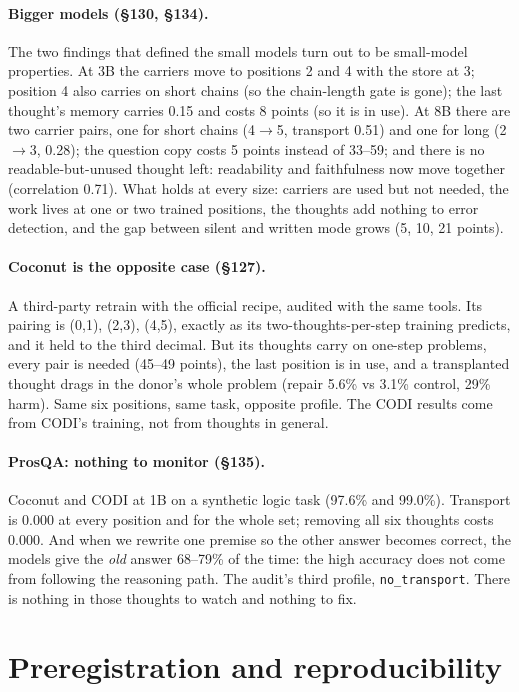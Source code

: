 \documentclass{article}
\begin{document}
\paragraph{Bigger models (\S130, \S134).} The two findings that defined the small models turn out to be small-model properties. At 3B the carriers move to positions 2 and 4 with the store at 3; position 4 also carries on short chains (so the chain-length gate is gone); the last thought's memory carries 0.15 and costs 8 points (so it is in use). At 8B there are two carrier pairs, one for short chains (4$\to$5, transport 0.51) and one for long (2$\to$3, 0.28); the question copy costs 5 points instead of 33--59; and there is no readable-but-unused thought left: readability and faithfulness now move together (correlation 0.71). What holds at every size: carriers are used but not needed, the work lives at one or two trained positions, the thoughts add nothing to error detection, and the gap between silent and written mode grows (5, 10, 21 points).

\paragraph{Coconut is the opposite case (\S127).} A third-party retrain with the official recipe, audited with the same tools. Its pairing is (0,1), (2,3), (4,5), exactly as its two-thoughts-per-step training predicts, and it held to the third decimal. But its thoughts carry on one-step problems, every pair is needed (45--49 points), the last position is in use, and a transplanted thought drags in the donor's whole problem (repair 5.6\% vs 3.1\% control, 29\% harm). Same six positions, same task, opposite profile. The CODI results come from CODI's training, not from thoughts in general.

\paragraph{ProsQA: nothing to monitor (\S135).} Coconut and CODI at 1B on a synthetic logic task (97.6\% and 99.0\%). Transport is 0.000 at every position and for the whole set; removing all six thoughts costs 0.000. And when we rewrite one premise so the other answer becomes correct, the models give the \emph{old} answer 68--79\% of the time: the high accuracy does not come from following the reasoning path. The audit's third profile, \texttt{no\_transport}. There is nothing in those thoughts to watch and nothing to fix.

\section{Preregistration and reproducibility}
\end{document}
